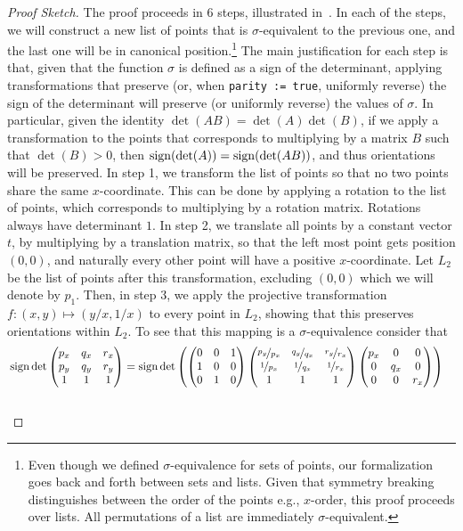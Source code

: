 \begin{proof}[Proof Sketch]
The proof proceeds in 6 steps, illustrated in~. In each of the steps, we will construct a new list of points that is $\sigma$-equivalent to the previous one, and the last one will be in canonical position.\footnote{Even though we defined $\sigma$-equivalence for sets of points, our formalization goes back and forth between sets and lists. Given that symmetry breaking distinguishes between the order of the points e.g., $x$-order, this proof proceeds over lists. All permutations of a list are immediately $\sigma$-equivalent.}
The main justification for each step is that, given that the function $\sigma$ is defined as a sign of the determinant, applying transformations that preserve (or, when \lstinline|parity := true|, uniformly reverse) the sign of the determinant will preserve (or uniformly reverse) the values of $\sigma$. In particular, given the identity $\det(AB) = \det(A)\det(B)$, if we apply a transformation to the points that corresponds to multiplying by a matrix $B$ such that $\det(B) > 0$, then $\operatorname{sign}(\det(A)) = \operatorname{sign}(\det(AB))$, and thus orientations will be preserved.
In step 1, we transform the list of points so that no two points share the same $x$-coordinate. This can be done by applying a rotation to the list of points, which corresponds to multiplying by a rotation matrix.
Rotations always have determinant $1$. 
In step 2, we translate all points by a constant vector $t$, by multiplying by a translation matrix, so that the left most point gets position $(0, 0)$, and naturally every other point will have a positive $x$-coordinate.
Let $L_2$ be the list of points after this transformation, excluding $(0,0)$ which we will denote by $p_1$.
Then, in step 3, we  apply the projective transformation $f: (x, y) \mapsto (y/x, 1/x)$ to every point in $L_2$, showing that this preserves orientations within $L_2$.
To see that this mapping is a $\sigma$-equivalence consider that 
\[
\begin{multlined}
 \sign \det \begin{pmatrix} p_x & q_x & r_x \\ p_y & q_y & r_y \\ 1 & 1 & 1 \end{pmatrix} =  \sign \det \left( \begin{pmatrix} 0 & 0 & 1 \\ 1 & 0 & 0\\ 0 & 1 & 0 \end{pmatrix}  \begin{pmatrix} \nicefrac{p_y}{p_x} & \nicefrac{q_y}{q_x} & \nicefrac{r_y}{r_x} \\ \nicefrac{1}{p_x} & \nicefrac{1}{q_x} & \nicefrac{1}{r_x} \\ 1 & 1 & 1 \end{pmatrix}  \begin{pmatrix} p_x & 0 & 0 \\ 0 & q_x & 0\\ 0 & 0 & r_x \end{pmatrix} \right)\\

\end{multlined}\]
\end{proof}
